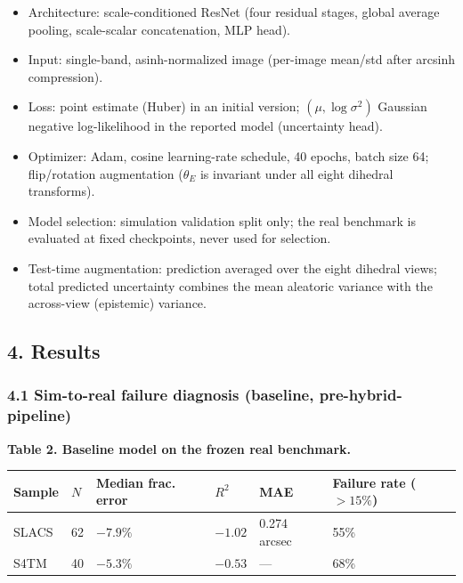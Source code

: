 \documentclass[
  11pt,
]{article}
\providecommand{\tightlist}{%
  \setlength{\itemsep}{0pt}\setlength{\parskip}{0pt}}
\begin{document}
\begin{itemize}
\tightlist
\item
  Architecture: scale-conditioned ResNet (four residual stages, global
  average pooling, scale-scalar concatenation, MLP head).
\item
  Input: single-band, asinh-normalized image (per-image mean/std after
  arcsinh compression).
\item
  Loss: point estimate (Huber) in an initial version;
  \((\mu, \log\sigma^2)\) Gaussian negative log-likelihood in the
  reported model (uncertainty head).
\item
  Optimizer: Adam, cosine learning-rate schedule, 40 epochs, batch size
  64; flip/rotation augmentation (\(\theta_E\) is invariant under all
  eight dihedral transforms).
\item
  Model selection: simulation validation split only; the real benchmark
  is evaluated at fixed checkpoints, never used for selection.
\item
  Test-time augmentation: prediction averaged over the eight dihedral
  views; total predicted uncertainty combines the mean aleatoric
  variance with the across-view (epistemic) variance.
\end{itemize}

\hypertarget{results}{%
\subsection{4. Results}\label{results}}

\hypertarget{sim-to-real-failure-diagnosis-baseline-pre-hybrid-pipeline}{%
\subsubsection{4.1 Sim-to-real failure diagnosis (baseline,
pre-hybrid-pipeline)}\label{sim-to-real-failure-diagnosis-baseline-pre-hybrid-pipeline}}

\textbf{Table 2. Baseline model on the frozen real benchmark.}

\begin{longtable}[]{@{}llllll@{}}
\toprule
Sample & \(N\) & Median frac. error & \(R^2\) & MAE & Failure rate
(\(>15\%\)) \\
\midrule
\endhead
SLACS & 62 & \(-7.9\%\) & \(-1.02\) & 0.274 arcsec & 55\% \\
S4TM & 40 & \(-5.3\%\) & \(-0.53\) & --- & 68\% \\
\bottomrule
\end{longtable}
\end{document}
